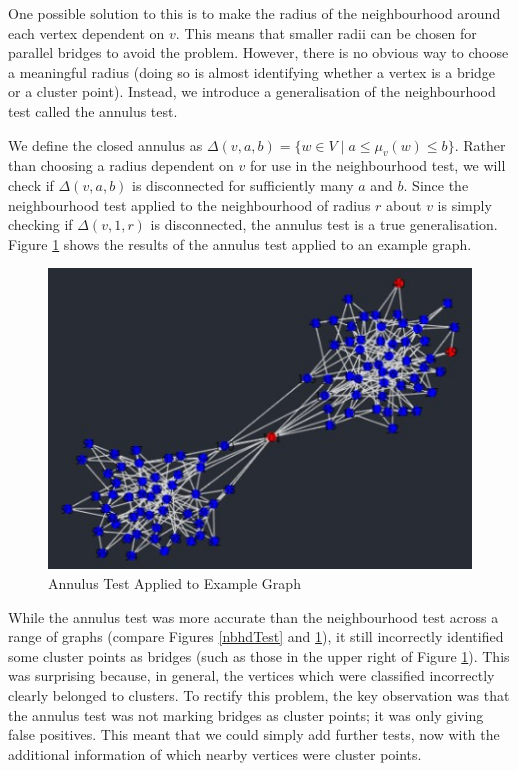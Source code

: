 \documentclass[12pt,a4paper]{amsart}
\numberwithin{equation}{section}
\def\D{\Delta}
\theoremstyle{plain}
\theoremstyle{definition}
\begin{document}
One possible solution to this is to make the radius of the neighbourhood around each vertex dependent on $v$. This means that smaller radii can be chosen for parallel bridges to avoid the problem. However, there is no obvious way to choose a meaningful radius (doing so is almost identifying whether a vertex is a bridge or a cluster point). Instead, we introduce a generalisation of the neighbourhood test called the annulus test. 

\newpage

We define the closed annulus as $\D(v,a,b) = \{w \in V \mid a \leq \mu_v(w) \leq b\}$. Rather than choosing a radius dependent on $v$ for use in the neighbourhood test, we will check if $\D(v,a,b)$ is disconnected for sufficiently many $a$ and $b$. Since the neighbourhood test applied to the neighbourhood of radius $r$ about $v$ is simply checking if $\D(v,1,r)$ is disconnected, the annulus test is a true generalisation. Figure \ref{annulTest} shows the results of the annulus test applied to an example graph.

\begin{figure}[h]
	\centering
	\includegraphics[scale=1]{AnnulusTest.jpg}
	\caption{Annulus Test Applied to Example Graph}
	\label{annulTest}
\end{figure}

While the annulus test was more accurate than the neighbourhood test across a range of graphs (compare Figures \ref{nbhdTest} and \ref{annulTest}), it still incorrectly identified some cluster points as bridges (such as those in the upper right of Figure \ref{annulTest}). This was surprising because, in general, the vertices which were classified incorrectly clearly belonged to clusters. To rectify this problem, the key observation was that the annulus test was not marking bridges as cluster points; it was only giving false positives. This meant that we could simply add further tests, now with the additional information of which nearby vertices were cluster points. 
\end{document}
